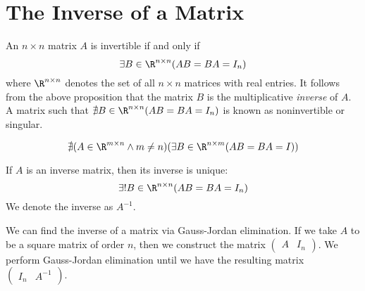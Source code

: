 \section{The Inverse of a Matrix}
\begin{definition}\label{def:4}
	An $n\times n$ matrix $A$ is invertible if and only if
	$$\exists B\in\R^{n\times n}(AB=BA=I_n)$$
	where $\R^{n\times n}$ denotes the set of all $n\times n$ matrices with real entries. It follows from the above proposition that the matrix $B$ is the multiplicative \emph{inverse} of $A$.\\
	A matrix such that $\nexists B\in\R^{n\times n}(AB=BA=I_n)$ is known as noninvertible or singular.
\end{definition}
\begin{proposition}
	$$\nexists (A\in\R^{m\times n}\land m\neq n)(\exists B\in\R^{n\times m}(AB=BA=I))$$
\end{proposition}
\begin{theorem}\label{thm:5}
	If $A$ is an inverse matrix, then its inverse is unique:
	$$\exists! B\in\R^{n\times n}(AB=BA=I_n)$$
	We denote the inverse as $A^{-1}$.
\end{theorem}
We can find the inverse of a matrix via Gauss-Jordan elimination. If we take $A$ to be a square matrix of order $n$, then we construct the matrix $\begin{pmatrix}A&I_n\end{pmatrix}$. We perform Gauss-Jordan elimination until we have the resulting matrix $\begin{pmatrix}I_n&A^{-1}\end{pmatrix}$.